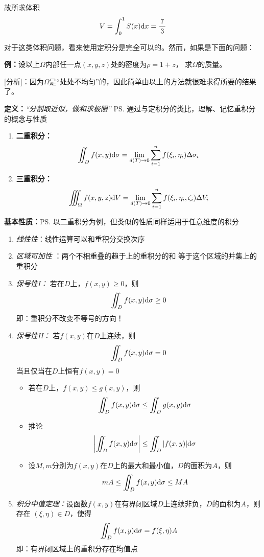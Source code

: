 故所求体积
$$V=\displaystyle\int_0^1S(x)\mathrm{d} x=\displaystyle\frac{\,{7}\,}{\,{3}\,}$$

对于这类体积问题，看来使用定积分是完全可以的。然而，如果是下面的问题：

{\bf 例：}设以上$\Omega$内部任一点$(x,y,z)$处的密度为$\rho=1+z$，
求$\Omega$的质量。

[分析]：因为$\Omega$是“处处不均匀”的，因此简单由以上的方法就很难求得所要的结果了。


{\bf 定义：}{\it “分割取近似，做和求极限”}
\ps{通过与定积分的类比，理解、记忆重积分的概念与性质}
\begin{enumerate}[(1)]
  \setlength{\itemindent}{1cm}
  \item {\bf 二重积分：} 
  $$\iint_Df(x,y)\mathrm{d}\sigma=\lim_{d(T)\to
  0}\sum_{i=1}^nf(\xi_i,\eta_i)\Delta\sigma_i$$ 
  \item {\bf 三重积分：} 
  $$\iiint_{\Omega}f(x,y,z)\mathrm{d} V=\lim_{d(T)\to
  0}\sum_{i=1}^nf(\xi_i,\eta_i,\zeta_i)\Delta V_i$$
\end{enumerate}

{\bf 基本性质：}\ps{以二重积分为例，但类似的性质同样适用于任意维度的积分}
\begin{enumerate}[(1)]
  \setlength{\itemindent}{1cm}
  \item {\it 线性性}：线性运算可以和重积分交换次序 
  \item {\it 区域可加性} ：两个不相重叠的趋于上的重积分的和
  等于这个区域的并集上的重积分
  \item {\it 保号性I：} 若在$D$上，$f(x,y)\geq 0$，则
  $$\iint_Df(x,y)\mathrm{d}\sigma\geq 0$$ 
  即：重积分不改变不等号的方向！
  \item {\it 保号性II：} 若$f(x,y)$在$D$上连续，则
  $$\iint_Df(x,y)\mathrm{d}\sigma=0$$
  当且仅当在$D$上恒有$f(x,y)=0$
    \begin{itemize}
	  \item 若在$D$上，$f(x,y)\leq g(x,y)$，则
	  $$\iint_Df(x,y)\mathrm{d}\sigma\leq\iint_Dg(x,y)\mathrm{d}\sigma$$ 
	  \item 推论
	  $$\left|\iint_Df(x,y)\mathrm{d}\sigma\right|\leq\iint_D|f(x,y)|\mathrm{d}\sigma$$ 
	  \item 设$M,m$分别为$f(x,y)$在$D$上的最大和最小值，$D$的面积为$A$，则
	  $$mA\leq\iint_Df(x,y)\mathrm{d}\sigma\leq MA$$
	\end{itemize}
  \item {\it 积分中值定理：}设函数$f(x,y)$在有界闭区域$D$上连续非负，$D$的面积为$A$，则存在
	$(\xi,\eta)\in D$，使得
	$$\iint_Df(x,y)\mathrm{d}\sigma=f(\xi,\eta)A$$
  即：有界闭区域上的重积分存在均值点
\end{enumerate}

